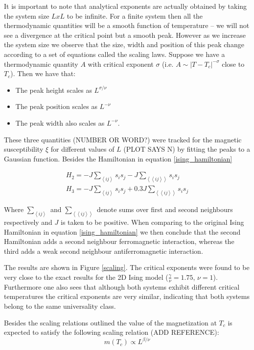 \documentclass[twoside]{article}
\def\mean#1{\left< #1 \right>}
\begin{document}
\begin{multicols}{2}
It is important to note that analytical exponents are actually obtained by taking the system size $LxL$ to be infinite. For a finite system then all the thermodynamic quantities will be a smooth function of temperature -- we will not see a divergence at the critical point but a smooth peak. However as we increase the system size we observe that the size, width and position of this peak change according to a set of equations called the scaling laws. Suppose we have a thermodynamic quantity $A$ with critical exponent $\sigma$ (i.e. $A \sim |T-T_c|^{-\sigma}$ close to $T_c$). Then we have that:

\begin{itemize}
\item The peak height scales as $L^{\sigma/\nu}$
\item The peak position scales as $L^{-\nu}$
\item The peak width also scales as $L^{-\nu}$.
\end{itemize}

These three quantities (NUMBER OR WORD?) were tracked for the magnetic susceptibility $\xi$ for different values of $L$ (PLOT SAYS N) by fitting the peaks to a Gaussian function. Besides the Hamiltonian in equation \eqref{ising_hamiltonian}

\begin{align}
\label{second_neigh_hamil}
H_2 = -J\sum_{\mean{ij}} s_i s_j  -J\sum_{\mean{\mean{ij}}} s_i s_j \\
\label{anti_hamil}
H_3 = -J\sum_{\mean{ij}} s_i s_j + 0.3 J \sum_{\mean{\mean{ij}}} s_i s_j 
\end{align}

Where $\sum_{\mean{ij}}$ and $\sum_{\mean{\mean{ij}}}$ denote sums over first and second neighbours respectively and $J$ is taken to be positive. When comparing to the original Ising Hamiltonian in equation \eqref{ising_hamiltonian} we then conclude that the second Hamiltonian adds a second neighbour ferromagnetic interaction, whereas the third adds a weak second neighbour antiferromagnetic interaction.


The results are shown in Figure \ref{scaling}. The critical exponents were found to be very close to the exact results for the 2D Ising model ($\frac{\gamma}{\nu} = 1.75$, $\nu = 1$). Furthermore one also sees that although both systems exhibit different critical temperatures the critical exponents are very similar, indicating that both systems belong to the same universality class.

Besides the scaling relations outlined the value of the magnetization at $T_c$ is expected to satisfy the following scaling relation (ADD REFERENCE):
\begin{equation}
m(T_c) \propto L^{\beta/\nu}
\end{equation}


\end{multicols}
\end{document}
